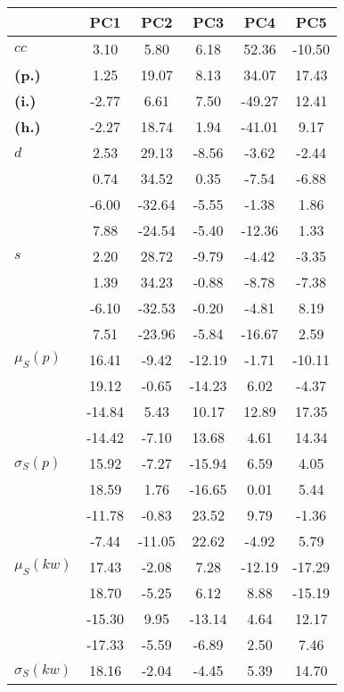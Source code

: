 \begin{table}[h!]
\begin{center}
\begin{tabular}{| l || c | c | c | c | c |}\hline
 & {\bf PC1} & {\bf PC2} & {\bf PC3} & {\bf PC4} & {\bf PC5} \\\hline\hline
{\bf $cc$} & 3.10 & 5.80 & 6.18 & 52.36 & -10.50 \\
{\bf (p.)} & 1.25 & 19.07 & 8.13 & 34.07 & 17.43 \\
{\bf (i.)} & -2.77 & 6.61 & 7.50 & -49.27 & 12.41 \\
{\bf (h.)} & -2.27 & 18.74 & 1.94 & -41.01 & 9.17 \\\hline
{\bf $d$} & 2.53 & 29.13 & -8.56 & -3.62 & -2.44 \\
{\bf } & 0.74 & 34.52 & 0.35 & -7.54 & -6.88 \\
{\bf } & -6.00 & -32.64 & -5.55 & -1.38 & 1.86 \\
{\bf } & 7.88 & -24.54 & -5.40 & -12.36 & 1.33 \\\hline
{\bf $s$} & 2.20 & 28.72 & -9.79 & -4.42 & -3.35 \\
{\bf } & 1.39 & 34.23 & -0.88 & -8.78 & -7.38 \\
 & -6.10  & -32.53  & -0.20  & -4.81  & 8.19 \\
 & 7.51  & -23.96  & -5.84  & -16.67  & 2.59 \\\hline
$\mu_S(p)$ & 16.41  & -9.42  & -12.19  & -1.71  & -10.11 \\
 & 19.12  & -0.65  & -14.23  & 6.02  & -4.37 \\
 & -14.84  & 5.43  & 10.17  & 12.89  & 17.35 \\
 & -14.42  & -7.10  & 13.68  & 4.61  & 14.34 \\\hline
$\sigma_S(p)$ & 15.92  & -7.27  & -15.94  & 6.59  & 4.05 \\
 & 18.59  & 1.76  & -16.65  & 0.01  & 5.44 \\
 & -11.78  & -0.83  & 23.52  & 9.79  & -1.36 \\
 & -7.44  & -11.05  & 22.62  & -4.92  & 5.79 \\\hline
$\mu_S(kw)$ & 17.43  & -2.08  & 7.28  & -12.19  & -17.29 \\
 & 18.70  & -5.25  & 6.12  & 8.88  & -15.19 \\
 & -15.30  & 9.95  & -13.14  & 4.64  & 12.17 \\
 & -17.33  & -5.59  & -6.89  & 2.50  & 7.46 \\\hline
$\sigma_S(kw)$ & 18.16  & -2.04  & -4.45  & 5.39  & 14.70 \\

\end{tabular}
\end{center}
\end{table}
